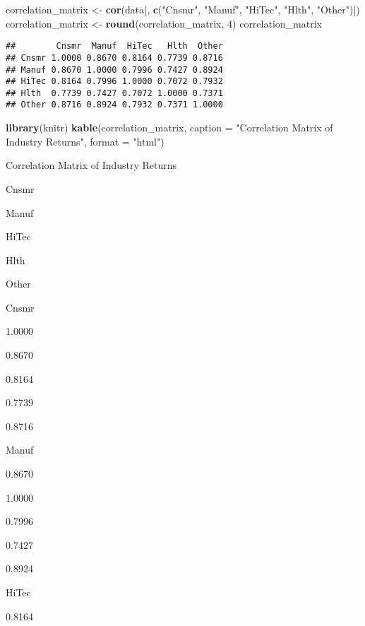 \documentclass[
]{article}
\newenvironment{Shaded}{\begin{snugshade}}{\end{snugshade}}
\newcommand{\AttributeTok}[1]{\textcolor[rgb]{0.13,0.29,0.53}{#1}}
\newcommand{\DecValTok}[1]{\textcolor[rgb]{0.00,0.00,0.81}{#1}}
\newcommand{\FunctionTok}[1]{\textcolor[rgb]{0.13,0.29,0.53}{\textbf{#1}}}
\newcommand{\NormalTok}[1]{#1}
\newcommand{\OtherTok}[1]{\textcolor[rgb]{0.56,0.35,0.01}{#1}}
\newcommand{\StringTok}[1]{\textcolor[rgb]{0.31,0.60,0.02}{#1}}
\begin{document}
\begin{Shaded}
\begin{Highlighting}[]
\NormalTok{correlation\_matrix }\OtherTok{\textless{}{-}} \FunctionTok{cor}\NormalTok{(data[, }\FunctionTok{c}\NormalTok{(}\StringTok{"Cnsmr"}\NormalTok{, }\StringTok{"Manuf"}\NormalTok{, }\StringTok{"HiTec"}\NormalTok{, }\StringTok{"Hlth"}\NormalTok{, }\StringTok{"Other"}\NormalTok{)])}
\NormalTok{correlation\_matrix }\OtherTok{\textless{}{-}} \FunctionTok{round}\NormalTok{(correlation\_matrix, }\DecValTok{4}\NormalTok{)}
\NormalTok{correlation\_matrix}
\end{Highlighting}
\end{Shaded}

\begin{verbatim}
##        Cnsmr  Manuf  HiTec   Hlth  Other
## Cnsmr 1.0000 0.8670 0.8164 0.7739 0.8716
## Manuf 0.8670 1.0000 0.7996 0.7427 0.8924
## HiTec 0.8164 0.7996 1.0000 0.7072 0.7932
## Hlth  0.7739 0.7427 0.7072 1.0000 0.7371
## Other 0.8716 0.8924 0.7932 0.7371 1.0000
\end{verbatim}

\begin{Shaded}
\begin{Highlighting}[]
\FunctionTok{library}\NormalTok{(knitr)}
\FunctionTok{kable}\NormalTok{(correlation\_matrix, }\AttributeTok{caption =} \StringTok{"Correlation Matrix of Industry Returns"}\NormalTok{, }\AttributeTok{format =} \StringTok{"html"}\NormalTok{)}
\end{Highlighting}
\end{Shaded}

Correlation Matrix of Industry Returns

Cnsmr

Manuf

HiTec

Hlth

Other

Cnsmr

1.0000

0.8670

0.8164

0.7739

0.8716

Manuf

0.8670

1.0000

0.7996

0.7427

0.8924

HiTec

0.8164
\end{document}
